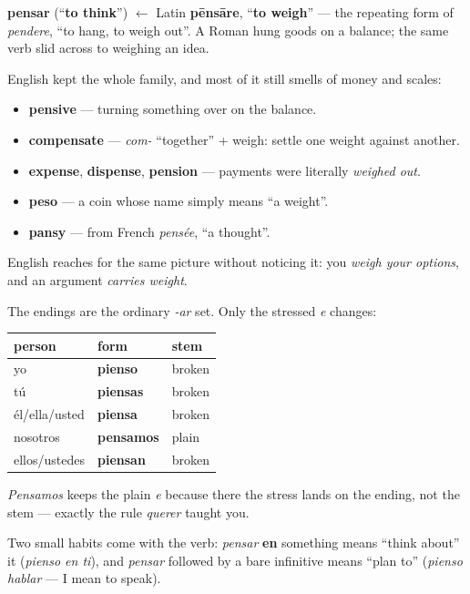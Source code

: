 \begin{cousinweb}
\textbf{pensar} (\textquotedblleft{}\textbf{to think}\textquotedblright{}) $\leftarrow$ Latin \textbf{pēnsāre}, \textquotedblleft{}\textbf{to weigh}\textquotedblright{} — the repeating form of \emph{pendere}, \textquotedblleft{}to hang, to weigh out\textquotedblright{}. A Roman hung goods on a balance; the same verb slid across to weighing an idea.

English kept the whole family, and most of it still smells of money and scales:

\begin{itemize}
\raggedright
  \item \textbf{pensive} — turning something over on the balance.
  \item \textbf{compensate} — \emph{com-} \textquotedblleft{}together\textquotedblright{} + weigh: settle one weight against another.
  \item \textbf{expense}, \textbf{dispense}, \textbf{pension} — payments were literally \emph{weighed out}.
  \item \textbf{peso} — a coin whose name simply means \textquotedblleft{}a weight\textquotedblright{}.
  \item \textbf{pansy} — from French \emph{pensée}, \textquotedblleft{}a thought\textquotedblright{}.
\end{itemize}

English reaches for the same picture without noticing it: you \emph{weigh your options}, and an argument \emph{carries weight}.
\end{cousinweb}

\begin{grammarlens}[title={Grammar Lens: the same endings, a broken stem}]
The endings are the ordinary \emph{-ar} set. Only the stressed \emph{e} changes:

\noindent
\begin{tabularx}{\linewidth}{@{}>{\raggedright\arraybackslash}X>{\raggedright\arraybackslash}X>{\raggedright\arraybackslash}X@{}}
\toprule
\textbf{person} & \textbf{form} & \textbf{stem} \\
\midrule
yo & \textbf{pienso} & broken \\
tú & \textbf{piensas} & broken \\
él/ella/usted & \textbf{piensa} & broken \\
nosotros & \textbf{pensamos} & plain \\
ellos/ustedes & \textbf{piensan} & broken \\
\bottomrule
\end{tabularx}

\emph{Pensamos} keeps the plain \emph{e} because there the stress lands on the ending, not the stem — exactly the rule \emph{querer} taught you.

Two small habits come with the verb: \emph{pensar} \textbf{en} something means \textquotedblleft{}think about\textquotedblright{} it (\emph{pienso en ti}), and \emph{pensar} followed by a bare infinitive means \textquotedblleft{}plan to\textquotedblright{} (\emph{pienso hablar} — I mean to speak).
\end{grammarlens}


